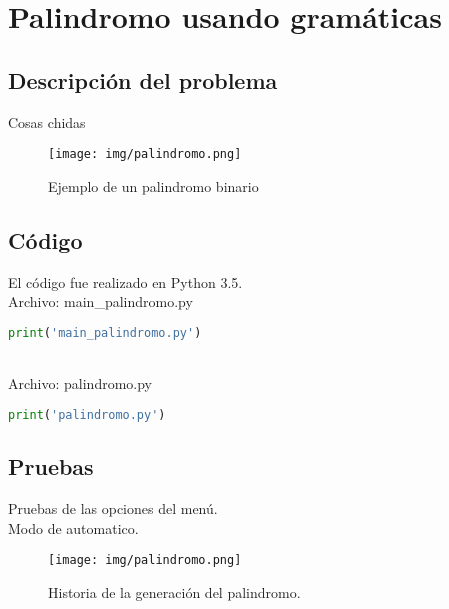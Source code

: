 \section{Palindromo usando gramáticas}
	\subsection{Descripción del problema}
	Cosas chidas
	\begin{figure}[H]
		\begin{center}
		\texttt{[image: img/palindromo.png]}
		\caption{Ejemplo de un palindromo binario}
		\label{fig:diagrama-palindromo}
		\end{center}
	\end{figure}
	\subsection{Código}
	El código fue realizado en Python 3.5.
	\\Archivo: main\_palindromo.py
	\begin{lstlisting}[language=Python]
	print('main_palindromo.py')
	\end{lstlisting}
	\\Archivo: palindromo.py
	\begin{lstlisting}[language=Python]
	print('palindromo.py')
	\end{lstlisting}
	\subsection{Pruebas}
	Pruebas de las opciones del menú.
	\\
	{\large Modo de automatico.}
	\begin{figure}[H]
		\begin{center}
			\texttt{[image: img/palindromo.png]}
			\caption{Historia de la generación del palindromo.}
			\label{fig:palindromo1}
		\end{center}
	\end{figure}